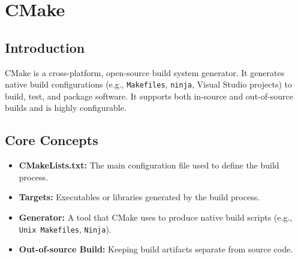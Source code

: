 \chapter{CMake}

\section{Introduction}
CMake is a cross-platform, open-source build system generator. It generates native build configurations (e.g., \texttt{Makefiles}, \texttt{ninja}, Visual Studio projects) to build, test, and package software. It supports both in-source and out-of-source builds and is highly configurable.

\section{Core Concepts}
\begin{itemize}
    \item \textbf{CMakeLists.txt:} The main configuration file used to define the build process.
    \item \textbf{Targets:} Executables or libraries generated by the build process.
    \item \textbf{Generator:} A tool that CMake uses to produce native build scripts (e.g., \texttt{Unix Makefiles}, \texttt{Ninja}).
    \item \textbf{Out-of-source Build:} Keeping build artifacts separate from source code.
\end{itemize}

